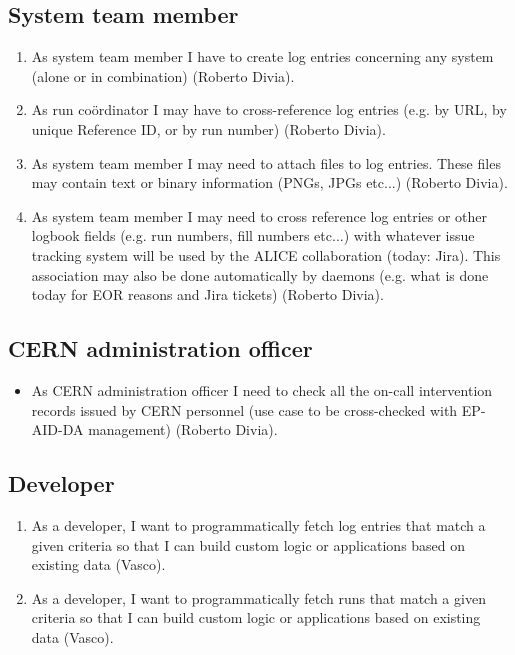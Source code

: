 \documentclass[a4paper,11pt]{book}
\begin{document}
\subsection{System team member}
\begin{enumerate}
  \item As system team member I have to create log entries concerning any system (alone or in combination) (Roberto Divia).
  \item As run co\"ordinator I may have to cross-reference log entries (e.g. by URL, by unique Reference ID, or by run number)  (Roberto Divia).
  \item  As system team member I may need to attach files to log entries. These files may contain text or binary information (PNGs, JPGs etc...) (Roberto Divia).
  \item As system team member I may need to cross reference log entries or other logbook fields (e.g. run numbers, fill numbers etc...) with whatever issue tracking system will be used by the ALICE collaboration (today: Jira). This association may also be done automatically by daemons (e.g. what is done today for EOR reasons and Jira tickets) (Roberto Divia).
\end{enumerate}

\subsection{CERN administration officer}
\begin{itemize}
  \item As CERN administration officer I need to check all the on-call intervention records issued by CERN personnel (use case to be cross-checked with EP-AID-DA management) (Roberto Divia).
\end{itemize}

\subsection{Developer}
\begin{enumerate}
  \item As a developer, I want to programmatically fetch log entries that match a given criteria so that I can build custom logic or applications based on existing data (Vasco). 
  \item As a developer, I want to programmatically fetch runs that match a given criteria so that I can build custom logic or applications based on existing data (Vasco). 
\end{enumerate}
\end{document}
